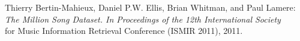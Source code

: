 \begin{thebibliography}{10}

Thierry Bertin-Mahieux, Daniel P.W. Ellis, Brian Whitman, and Paul Lamere: 
\emph{The Million Song Dataset. In Proceedings of the 12th International Society}
\\for Music Information Retrieval Conference (ISMIR 2011), 2011.

\end{thebibliography}